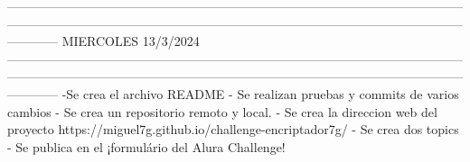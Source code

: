 ------------------------------------------------------------------------------------------------------------------------------------------------------------------------------------------------------------------------------------
                                                         MIERCOLES 13/3/2024
------------------------------------------------------------------------------------------------------------------------------------------------------------------------------------------------------------------------------------
        -Se crea el archivo README
        - Se realizan pruebas y commits de varios cambios 
        - Se crea un repositorio remoto y local.
        - Se crea la direccion web del proyecto https://miguel7g.github.io/challenge-encriptador7g/
        - Se crea dos topics
        - Se publica en el ¡formulário del Alura Challenge!
       
          